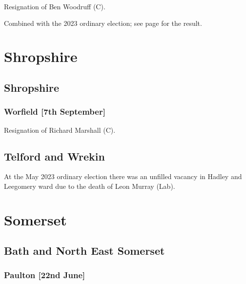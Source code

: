 \documentclass[a4paper,openany]{book}
\begin{document}
\begin{resultsiii}

Resignation of Ben Woodruff (C).

Combined with the 2023 ordinary election; see page \pageref{DucklingtonWestOxfordshire} for the result.

\section{Shropshire}

\subsection*{Shropshire}

\subsubsection*{Worfield \hspace*{\fill}\nolinebreak[1]%
	\enspace\hspace*{\fill}
	[7th September]}


Resignation of Richard Marshall (C).

\subsection*{Telford and Wrekin}

At the May 2023 ordinary election there was an unfilled vacancy in Hadley and Leegomery ward due to the death of Leon Murray (Lab).%

\section{Somerset}

\subsection*{Bath and North East Somerset}

\subsubsection*{Paulton \hspace*{\fill}\nolinebreak[1]%
	\enspace\hspace*{\fill}
	[22nd June]}


\end{resultsiii}
\end{document}
